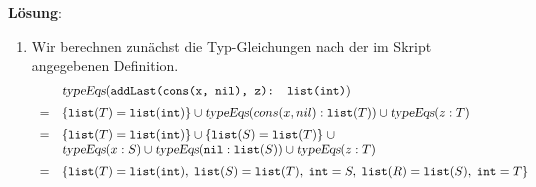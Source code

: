 \documentclass{article}
\newcommand{\solution}{
\vspace*{0.3cm}

\noindent
\textbf{L\"osung}: }
\begin{document}
\solution
\begin{enumerate}
\item Wir berechnen zun\"achst die Typ-Gleichungen nach der im Skript angegebenen Definition.
      \[
      \begin{array}[t]{cl}
           & \textsl{typeEqs}(\texttt{addLast(cons(x, nil), z): list(int)}) \\[0.2cm]
         = &       \{ \mathtt{list}(T) = \mathtt{list(int)} \} 
              \cup \textsl{typeEqs}(cons(x, nil): \mathtt{list}(T))
              \cup \textsl{typeEqs}(z: T)                     \\[0.2cm]
         = &       \{ \mathtt{list}(T) = \mathtt{list(int)} \} 
              \cup \{ \texttt{list}(S) = \mathtt{list}(T) \}\; \cup \\
           &       \textsl{typeEqs}(x: S)
              \cup \textsl{typeEqs}(\mathtt{nil}: \mathtt{list}(S))
              \cup \textsl{typeEqs}(z: T)                  \\[0.2cm]
         = &       \{ \mathtt{list}(T) = \mathtt{list(int)},\; 
                      \texttt{list}(S) = \mathtt{list}(T),\;           \mathtt{int} = S,\;
                      \mathtt{list}(R) = \mathtt{list}(S),\;
                      \mathtt{int} = T \}


\end{array}\]
\end{enumerate}
\end{document}
